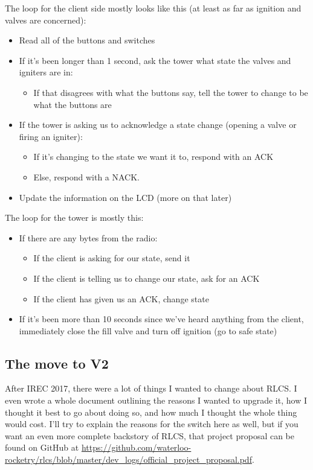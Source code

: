 \documentclass[11pt]{article}
\begin{document}
The loop for the client side mostly looks like this (at least as far as ignition
and valves are concerned):
\begin{itemize}
\item Read all of the buttons and switches
\item If it's been longer than 1 second, ask the tower what state the valves and
igniters are in:
\begin{itemize}
\item If that disagrees with what the buttons say, tell the tower to change to be
what the buttons are
\end{itemize}
\item If the tower is asking us to acknowledge a state change (opening a valve or
firing an igniter):
\begin{itemize}
\item If it's changing to the state we want it to, respond with an ACK
\item Else, respond with a NACK.
\end{itemize}
\item Update the information on the LCD (more on that later)
\end{itemize}

The loop for the tower is mostly this:
\begin{itemize}
\item If there are any bytes from the radio:
\begin{itemize}
\item If the client is asking for our state, send it
\item If the client is telling us to change our state, ask for an ACK
\item If the client has given us an ACK, change state
\end{itemize}
\item If it's been more than 10 seconds since we've heard anything from the client,
immediately close the fill valve and turn off ignition (go to safe state)
\end{itemize}
\subsection{The move to V2}
\label{sec:org64bece1}

After IREC 2017, there were a lot of things I wanted to change about RLCS. I
even wrote a whole document outlining the reasons I wanted to upgrade it, how I
thought it best to go about doing so, and how much I thought the whole thing
would cost. I'll try to explain the reasons for the switch here as well, but if
you want an even more complete backstory of RLCS, that project proposal can be
found on GitHub at
\url{https://github.com/waterloo-rocketry/rlcs/blob/master/dev\_logs/official\_project\_proposal.pdf}.
\end{document}
